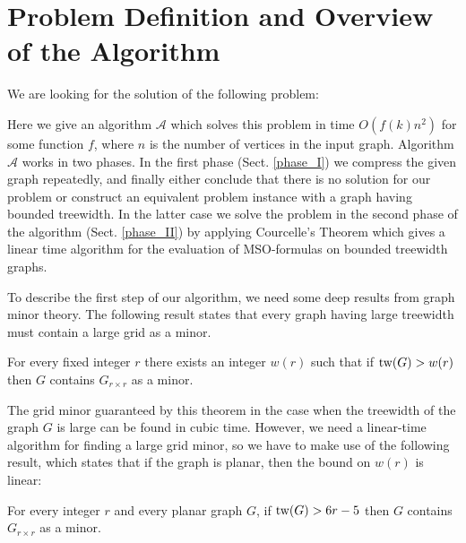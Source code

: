 \documentclass{llncs}
\begin{document}
\section{Problem Definition and Overview of the Algorithm}
\label{algo_sketch}
We are looking for the solution of the following problem:

\begin{center}
\end{center}

Here we give an algorithm $\mathcal{A}$ which solves this problem
in time $O(f(k)n^2)$ for some function $f$, where $n$ is the number of
vertices in the input graph.
Algorithm $\mathcal{A}$ works in two phases.
In the first phase (Sect. \ref{phase_I}) we compress the given graph repeatedly, and finally
either conclude that there is no solution for our problem or construct an equivalent problem instance
with a graph having bounded treewidth. In the latter case we solve the problem in the second phase
of the algorithm (Sect. \ref{phase_II}) by applying
Courcelle's Theorem which gives a linear time algorithm for the evaluation of MSO-formulas on
bounded treewidth graphs.

To describe the first step of our algorithm, we need some deep results from graph minor theory.
The following result states that every graph having large treewidth
must contain a large grid as a minor.

\begin{theorem}
\label{thm_egt}
For every fixed integer  $r$ there exists an integer $w(r)$ such that
if $\textup{tw}(G) > w(r)$  then $G$ contains $G_{r \times r}$ as a minor.
\end{theorem}

The grid minor guaranteed by this theorem in the case when the treewidth of the graph $G$ is large
can be found in cubic time. However, we need a linear-time algorithm for finding a large grid minor, 
so we have to make use of the following result, which states that
if the graph is planar, then the bound on $w(r)$ is linear:

\begin{theorem}
\label{thm_egt_planar}
For every integer $r$ and every planar graph $G$,
if $\textup{tw}(G) > 6r-5$ then $G$ contains $G_{r \times r}$ as a minor.
\end{theorem}
\end{document}
